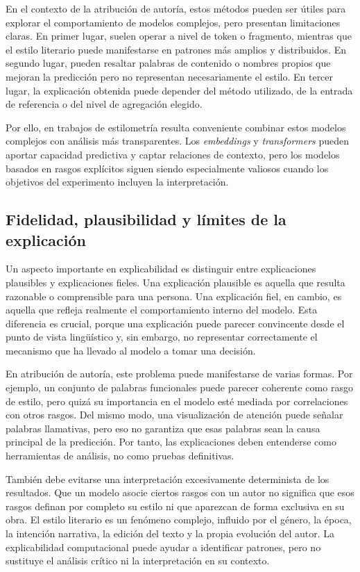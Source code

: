 \documentclass[IB]{TFUOC}%
\begin{document}
En el contexto de la atribución de autoría, estos métodos pueden ser útiles para explorar el comportamiento de modelos complejos, pero presentan limitaciones claras. En primer lugar, suelen operar a nivel de token o fragmento, mientras que el estilo literario puede manifestarse en patrones más amplios y distribuidos. En segundo lugar, pueden resaltar palabras de contenido o nombres propios que mejoran la predicción pero no representan necesariamente el estilo. En tercer lugar, la explicación obtenida puede depender del método utilizado, de la entrada de referencia o del nivel de agregación elegido.

Por ello, en trabajos de estilometría resulta conveniente combinar estos modelos complejos con análisis más transparentes. Los \textit{embeddings} y \textit{transformers} pueden aportar capacidad predictiva y captar relaciones de contexto, pero los modelos basados en rasgos explícitos siguen siendo especialmente valiosos cuando los objetivos del experimento incluyen la interpretación.

\subsection{Fidelidad, plausibilidad y límites de la explicación}

Un aspecto importante en explicabilidad es distinguir entre explicaciones plausibles y explicaciones fieles. Una explicación plausible es aquella que resulta razonable o comprensible para una persona. Una explicación fiel, en cambio, es aquella que refleja realmente el comportamiento interno del modelo\cite{jacovi2020towards}. Esta diferencia es crucial, porque una explicación puede parecer convincente desde el punto de vista lingüístico y, sin embargo, no representar correctamente el mecanismo que ha llevado al modelo a tomar una decisión.

En atribución de autoría, este problema puede manifestarse de varias formas. Por ejemplo, un conjunto de palabras funcionales puede parecer coherente como rasgo de estilo, pero quizá su importancia en el modelo esté mediada por correlaciones con otros rasgos. Del mismo modo, una visualización de atención puede señalar palabras llamativas, pero eso no garantiza que esas palabras sean la causa principal de la predicción. Por tanto, las explicaciones deben entenderse como herramientas de análisis, no como pruebas definitivas.

También debe evitarse una interpretación excesivamente determinista de los resultados. Que un modelo asocie ciertos rasgos con un autor no significa que esos rasgos definan por completo su estilo ni que aparezcan de forma exclusiva en su obra. El estilo literario es un fenómeno complejo, influido por el género, la época, la intención narrativa, la edición del texto y la propia evolución del autor. La explicabilidad computacional puede ayudar a identificar patrones, pero no sustituye el análisis crítico ni la interpretación en su contexto.
\end{document}
